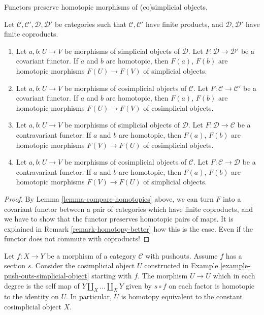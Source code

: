 \begin{lemma}
\label{lemma-functorial-homotopy}
\begin{slogan}
Functors preserve homotopic morphisms of (co)simplicial objects.
\end{slogan}
Let $\mathcal{C}, \mathcal{C}', \mathcal{D}, \mathcal{D}'$
be categories such that $\mathcal{C}, \mathcal{C}'$ have
finite products, and $\mathcal{D}, \mathcal{D}'$ have
finite coproducts.
\begin{enumerate}
\item Let $a, b : U \to V$ be morphisms of simplicial objects
of $\mathcal{D}$. Let $F : \mathcal{D} \to \mathcal{D}'$ be a covariant
functor. If $a$ and $b$ are homotopic, then $F(a)$, $F(b)$
are homotopic morphisms $F(U) \to F(V)$ of simplicial objects.
\item Let $a, b : U \to V$ be morphisms of cosimplicial objects
of $\mathcal{C}$. Let $F : \mathcal{C} \to \mathcal{C}'$ be a covariant
functor. If $a$ and $b$ are homotopic, then $F(a)$, $F(b)$
are homotopic morphisms $F(U) \to F(V)$ of cosimplicial objects.
\item Let $a, b : U \to V$ be morphisms of simplicial objects of $\mathcal{D}$.
Let $F : \mathcal{D} \to \mathcal{C}$ be a contravariant
functor. If $a$ and $b$ are homotopic, then $F(a)$, $F(b)$
are homotopic morphisms $F(V) \to F(U)$ of cosimplicial objects.
\item Let $a, b : U \to V$ be morphisms of cosimplicial objects of
$\mathcal{C}$.
Let $F : \mathcal{C} \to \mathcal{D}$ be a contravariant
functor. If $a$ and $b$ are homotopic, then $F(a)$, $F(b)$
are homotopic morphisms $F(V) \to F(U)$ of simplicial objects.
\end{enumerate}
\end{lemma}

\begin{proof}
By Lemma \ref{lemma-compare-homotopies} above, we can
turn $F$ into a covariant functor between a pair of
categories which have finite coproducts, and we have
to show that the functor preserves homotopic pairs
of maps. It is explained in Remark \ref{remark-homotopy-better} how this
is the case. Even if the functor does not commute with
coproducts!
\end{proof}

\begin{lemma}
\label{lemma-push-outs-simplicial-object-w-section}
Let $f : X \to Y$ be a morphism of a category $\mathcal{C}$ with
pushouts. Assume $f$ has a section $s$. Consider the
cosimplicial object $U$ constructed in
Example \ref{example-push-outs-simplicial-object}
starting with $f$. The morphism $U \to U$ which in each degree
is the self map of $Y \amalg_X \ldots \amalg_X Y$
given by $s \circ f$ on each factor is homotopic to the identity on $U$.
In particular, $U$ is homotopy equivalent to the constant
cosimplicial object $X$.
\end{lemma}

